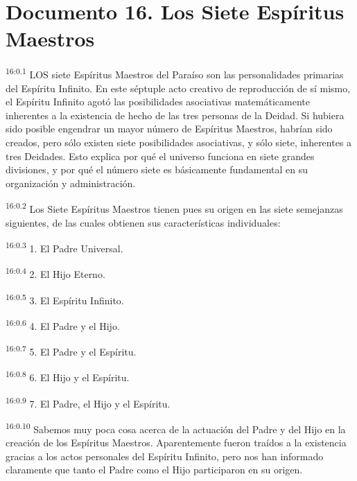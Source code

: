 \chapter{Documento 16. Los Siete Espíritus Maestros}
\par
\textsuperscript{16:0.1} LOS siete Espíritus Maestros del Paraíso son las personalidades primarias del Espíritu Infinito. En este séptuple acto creativo de reproducción de sí mismo, el Espíritu Infinito agotó las posibilidades asociativas matemáticamente inherentes a la existencia de hecho de las tres personas de la Deidad. Si hubiera sido posible engendrar un mayor número de Espíritus Maestros, habrían sido creados, pero sólo existen siete posibilidades asociativas, y sólo siete, inherentes a tres Deidades. Esto explica por qué el universo funciona en siete grandes divisiones, y por qué el número siete es básicamente fundamental en su organización y administración.

\par
\textsuperscript{16:0.2} Los Siete Espíritus Maestros tienen pues su origen en las siete semejanzas siguientes, de las cuales obtienen sus características individuales:

\par
\textsuperscript{16:0.3} 1. El Padre Universal.

\par
\textsuperscript{16:0.4} 2. El Hijo Eterno.

\par
\textsuperscript{16:0.5} 3. El Espíritu Infinito.

\par
\textsuperscript{16:0.6} 4. El Padre y el Hijo.

\par
\textsuperscript{16:0.7} 5. El Padre y el Espíritu.

\par
\textsuperscript{16:0.8} 6. El Hijo y el Espíritu.

\par
\textsuperscript{16:0.9} 7. El Padre, el Hijo y el Espíritu.

\par
\textsuperscript{16:0.10} Sabemos muy poca cosa acerca de la actuación del Padre y del Hijo en la creación de los Espíritus Maestros. Aparentemente fueron traídos a la existencia gracias a los actos personales del Espíritu Infinito, pero nos han informado claramente que tanto el Padre como el Hijo participaron en su origen.

